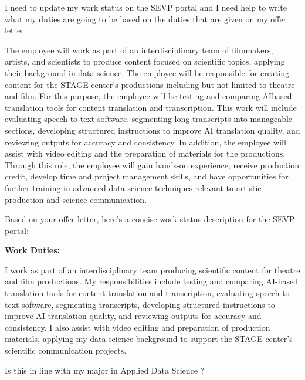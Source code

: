 \begin{userprompt}

I need to update my work status on the SEVP portal and I need help to write what my duties are going to be based on the duties that are given on my offer letter

The employee will work as part of an interdisciplinary team of filmmakers, artists, and scientists to produce content focused on scientific topics, applying their background in data science. The employee will be responsible for creating content for the STAGE center’s productions including but not limited to theatre and film. For this purpose, the employee will be testing and comparing AIbased translation tools for content translation and transcription. This work will include evaluating speech-to-text software, segmenting long transcripts into manageable sections, developing structured instructions to improve AI translation quality, and reviewing outputs for accuracy and consistency. In addition, the employee will assist with video editing and the preparation of materials for the productions. Through this role, the employee will gain hands-on experience, receive production credit, develop time and project management skills, and have opportunities for further training in advanced data science techniques relevant to artistic production and science communication.
\end{userprompt}

\begin{botresponse}
Based on your offer letter, here's a concise work status description for the SEVP portal:

\textbf{Work Duties:}

I work as part of an interdisciplinary team producing scientific content for theatre and film productions. My responsibilities include testing and comparing AI-based translation tools for content translation and transcription, evaluating speech-to-text software, segmenting transcripts, developing structured instructions to improve AI translation quality, and reviewing outputs for accuracy and consistency. I also assist with video editing and preparation of production materials, applying my data science background to support the STAGE center's scientific communication projects.
\end{botresponse}

\begin{userprompt}
Is this in line with my major in Applied Data Science ?
\end{userprompt}

